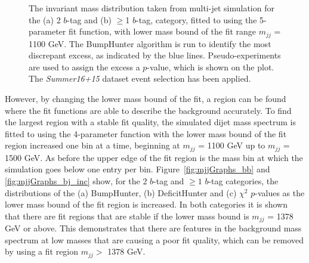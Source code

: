 \begin{figure}[!ht]
  \begin{center}
    \captionsetup[subfigure]{aboveskip=0pt,justification=centering}
  \end{center}
  \caption{ The invariant mass distribution taken from multi-jet simulation for the (a) 2 $b$-tag and (b) $\geq$1 $b$-tag,
    category, fitted to using the 5-parameter fit function, with lower mass bound of the fit range $m_{jj}$ = 1100 GeV.
    The BumpHunter algorithm is run to identify the most discrepant excess, as indicated by the blue lines.
    Pseudo-experiments are used to assign the excess a $p$-value, which is shown on the plot.
    The \textit{Summer16+15} dataset event selection has been applied.}
  \label{fig:Short_5para_1100_figure1}
\end{figure}

\FloatBarrier

However, by changing the lower mass bound of the fit,
a region can be found where the fit functions are able to describe the background accurately.
To find the largest region with a stable fit quality, the simulated dijet mass spectrum is
fitted to using the 4-parameter function with the lower mass bound of the fit region increased one bin at a time,
beginning at $m_{jj}$ = 1100 GeV up to $m_{jj}$ = 1500 GeV.
As before the upper edge of the fit region is the mass bin at which the simulation goes below one entry per bin.
Figure~\ref{fig:mjjGraphs_bb} and \ref{fig:mjjGraphs_bj_inc} show,
for the 2 $b$-tag and $\geq1$ $b$-tag categories, the distributions of the
(a) BumpHunter, (b) DeficitHunter and (c) $\chi^{2}$ $p$-values as the lower mass bound of the fit region is increased.
In both categories it is shown that there are fit regions that are stable if the lower mass bound is $m_{jj}$ = 1378 GeV or above.
This demonstrates that there are features in the background mass spectrum at low masses that are causing a poor fit quality,
which can be removed by using a fit region $m_{jj} >$ 1378 GeV. 

